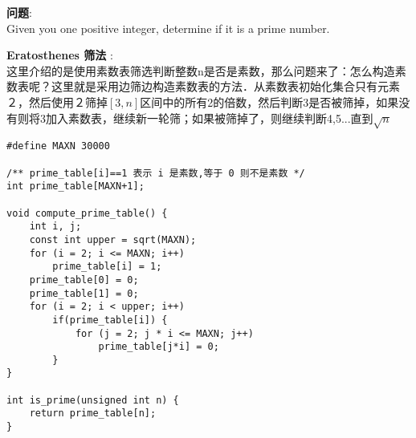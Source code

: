     
\begin{description}
    \item{\textbf{问题}}:\\
Given you one positive integer, determine if it is a prime number.
    \item{\textbf{Eratosthenes 筛法}} : 
	\\这里介绍的是使用素数表筛选判断整数n是否是素数，那么问题来了：怎么构造素数表呢？这里就是采用边筛边构造素数表的方法．从素数表初始化集合只有元素２，然后使用２筛掉$[3,n]$区间中的所有2的倍数，然后判断3是否被筛掉，如果没有则将3加入素数表，继续新一轮筛；如果被筛掉了，则继续判断4,5...直到$\sqrt{n}$
    \begin{lstlisting}
#define MAXN 30000

/** prime_table[i]==1 表示 i 是素数,等于 0 则不是素数 */
int prime_table[MAXN+1];

void compute_prime_table() {
	int i, j;
	const int upper = sqrt(MAXN);
	for (i = 2; i <= MAXN; i++) 
		prime_table[i] = 1;
	prime_table[0] = 0;
	prime_table[1] = 0;
	for (i = 2; i < upper; i++) 
		if(prime_table[i]) {
			for (j = 2; j * i <= MAXN; j++) 
				prime_table[j*i] = 0;
		}
}

int is_prime(unsigned int n) {
	return prime_table[n];
}
    \end{lstlisting}
\end{description}
